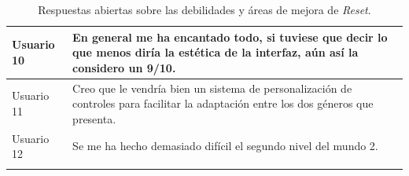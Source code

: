 \begin{longtable}{|l|p{12.5cm}|}
Usuario 10 & En general me ha encantado todo, si tuviese que decir lo que menos diría la estética de la interfaz, aún así la considero un 9/10. \\ \hline
Usuario 11 & Creo que le vendría bien un sistema de personalización de controles para facilitar la adaptación entre los dos géneros que presenta. \\ \hline
Usuario 12 & Se me ha hecho demasiado difícil el segundo nivel del mundo 2. \\ \hline
\caption{Respuestas abiertas sobre las debilidades y áreas de mejora de \textit{Reset}.}
\label{tab:comentarios_menos_gustado}
\end{longtable}
